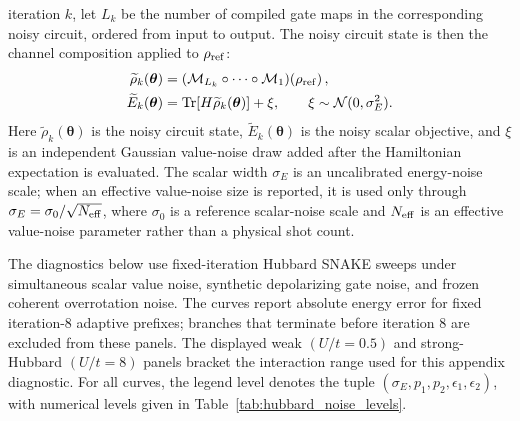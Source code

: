 \documentclass[
  reprint,
  amsmath,
  amssymb,
  aps,
  pra,
  nofootinbib,
  superscriptaddress,
  floatfix
]{revtex4-2}
\begin{document}
iteration \(k\), let \(L_k\) be the number of compiled gate maps in the
corresponding noisy circuit, ordered from input to output. The noisy circuit
state is then the channel composition applied to \(\rho_{\rm ref}\):
\begin{equation*}
\begin{aligned}
\widetilde\rho_k(\boldsymbol{\theta})
&=
\left(\mathcal M_{L_k}\circ\cdots\circ\mathcal M_1\right)
\!\left(\rho_{\rm ref}\right),
\\
\widetilde E_k(\boldsymbol{\theta})
&=
\operatorname{Tr}\!\left[
H\widetilde\rho_k(\boldsymbol{\theta})
\right]
+\xi,
\qquad
\xi\sim\mathcal N(0,\sigma_E^2).
\end{aligned}
\end{equation*}
Here \(\widetilde\rho_k(\boldsymbol{\theta})\) is the noisy circuit state,
\(\widetilde E_k(\boldsymbol{\theta})\) is the noisy scalar objective, and
\(\xi\) is an independent Gaussian value-noise draw added after the Hamiltonian
expectation is evaluated. The scalar width \(\sigma_E\) is an uncalibrated
energy-noise scale; when an effective value-noise size is reported, it is used
only through \(\sigma_E=\sigma_0/\sqrt{N_{\rm eff}}\), where \(\sigma_0\) is a
reference scalar-noise scale and \(N_{\rm eff}\) is an effective value-noise
parameter rather than a physical shot count.

The diagnostics below use fixed-iteration Hubbard SNAKE sweeps under simultaneous scalar value noise, synthetic depolarizing gate noise, and frozen coherent overrotation noise. The curves report absolute energy error for fixed iteration-8 adaptive prefixes; branches that terminate before iteration 8 are excluded from these panels. The displayed weak \((U/t=0.5)\) and strong-Hubbard \((U/t=8)\) panels bracket the interaction range used for this appendix diagnostic. For all curves, the legend level denotes the tuple \((\sigma_E,p_1,p_2,\epsilon_1,\epsilon_2)\), with numerical levels given in Table~\ref{tab:hubbard_noise_levels}.
\end{document}
